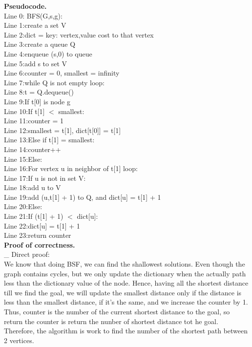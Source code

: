 \documentclass[11pt]{article}
\newcommand{\tab}{\hspace*{2em}}
\begin{document}
\noindent
\textbf{Pseudocode.}\\
Line 0: BFS(G,s,g):\\
Line 1:\tab create a set V\\
Line 2:\tab dict = key: vertex,value cost to that vertex\\
Line 3:\tab create a queue Q\\
Line 4:\tab enqueue (s,0) to queue\\
Line 5:\tab add s to set V\\
Line 6:\tab counter = 0, smallest = infinity\\
Line 7:\tab while Q is not empty loop:\\
Line 8:\tab\tab t = Q.dequeue()\\
Line 9:\tab\tab If t[0] is node g\\
Line 10:\tab\tab\tab If t[1] $<$ smallest:\\
Line 11:\tab\tab\tab\tab counter = 1\\
Line 12:\tab\tab\tab\tab smallest = t[1], dict[t[0]] = t[1]\\
Line 13:\tab\tab\tab Else if t[1] = smallest:\\
Line 14:\tab\tab\tab\tab counter++\\
Line 15:\tab\tab Else:\\
Line 16:\tab\tab\tab For vertex u in neighbor of t[1] loop:\\
Line 17:\tab\tab\tab\tab If u is not in set V:\\
Line 18:\tab\tab\tab\tab\tab add u to V\\
Line 19:\tab\tab\tab\tab\tab add (u,t[1] + 1) to Q, and dict[u] = t[1] + 1\\
Line 20:\tab\tab\tab\tab Else:\\
Line 21:\tab\tab\tab\tab\tab If (t[1] + 1) $ < $ dict[u]:\\
Line 22:\tab\tab\tab\tab\tab\tab dict[u] = t[1] + 1\\
Line 23:\tab return counter\\

\noindent
\textbf{Proof of correctness.}\\
\_ Direct proof:\\
We know that doing BSF, we can find the shallowest solutions. Even though the graph contains cycles, but we only update the dictionary when the actually path less than the dictionary value of the node. Hence, having all the shortest distance till we find the goal, we will update the smallest distance only if the distance is less than the smallest distance, if it's the same, and we increase the counter by 1. Thus, counter is the number of the current shortest distance to the goal, so return the counter is return the nunber of shortest distance tot he goal. Therefore, the algorithm is work to find the number of the shortest path between 2 vertices.\\
\end{document}
